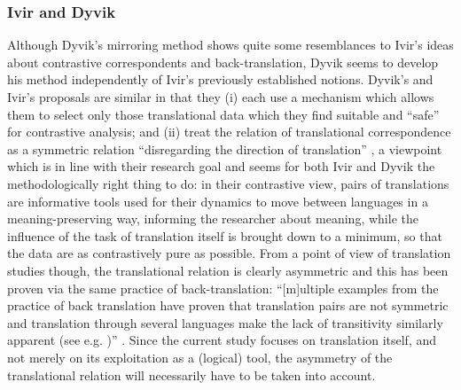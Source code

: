 \subsubsection{Ivir and Dyvik} 
\label{sec:2.3.4.3}  
Although Dyvik’s mirroring method shows quite some resemblances to Ivir’s ideas about contrastive correspondents and back-translation, Dyvik seems to develop his method independently of Ivir’s previously established notions. Dyvik’s and Ivir’s proposals are similar in that they (i) each use a mechanism which allows them to select only those translational data which they find suitable and ``safe'' for contrastive analysis; and (ii) treat the relation of translational correspondence as a symmetric relation “disregarding the direction of translation” \citep[314]{aijmer_translations_2004}, a viewpoint which is in line with their research goal and seems for both Ivir and Dyvik the methodologically right thing to do: in their contrastive view, pairs of translations are informative tools used for their dynamics to move between languages in a meaning-preserving way, informing the researcher about meaning, while the influence of the task of translation itself is brought down to a minimum, so that the data are as contrastively pure as possible. From a point of view of translation studies though, the translational relation is clearly asymmetric and this has been proven via the same practice of back-translation: “[m]ultiple examples from the practice of back translation have proven that translation pairs are not symmetric and translation through several languages make the lack of transitivity similarly apparent (see e.g. \citealt{Levy1989})” \citep[211]{halverson_concept_1997}. Since the current study focuses on translation itself, and not merely on its exploitation as a (logical) tool, the asymmetry of the translational relation will necessarily have to be taken into account.

